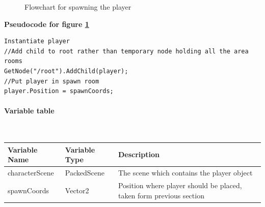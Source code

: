 \documentclass{article}
\newcommand{\myparagraph}[1]{\paragraph{#1}\mbox{}\\} %
\newcommand{\smallBr}{\vspace{1.5mm}}
\begin{document}
\begin{figure}[h]
    \centering
    \caption{Flowchart for spawning the player}
    \label{fig:spawn player}
\end{figure}

\textbf{Pseudocode for figure \ref{fig:spawn player}}
\begin{lstlisting}
Instantiate player
//Add child to root rather than temporary node holding all the area rooms
GetNode("/root").AddChild(player);
//Put player in spawn room
player.Position = spawnCoords;
\end{lstlisting}

\myparagraph{Variable table}
\smallBr
\begin{tabular}{l|l|l}
Variable Name  & Variable Type & Description                                                         \\ \hline
characterScene & PackedScene   & The scene which contains the player object                          \\
spawnCoords    & Vector2       & Position where player should be placed, taken form previous section
\end{tabular}
\end{document}
